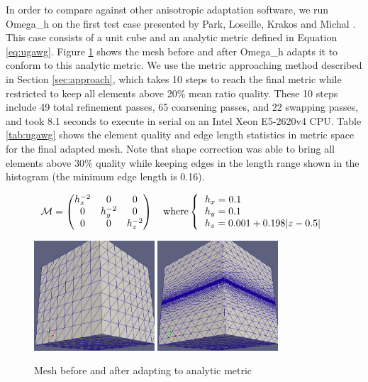 In order to compare against other anisotropic adaptation software,
we run Omega\_h on the first test case presented by Park,
Loseille, Krakos and Michal \cite{park2015comparing}.
This case consists of a unit cube and an analytic metric defined
in Equation \ref{eq:ugawg}.
Figure \ref{fig:ugawg} shows the mesh before and after Omega\_h adapts
it to conform to this analytic metric.
We use the metric approaching method described in Section \ref{sec:approach},
which takes 10 steps to reach the final metric while restricted
to keep all elements above 20\% mean ratio quality.
These 10 steps include 49 total refinement passes, 65 coarsening passes,
and 22 swapping passes, and took 8.1 seconds to execute in serial
on an Intel Xeon E5-2620v4 CPU.
Table \ref{tab:ugawg} shows the element quality and edge length statistics
in metric space for the final adapted mesh.
Note that shape correction was able to bring all elements above 30\% quality
while keeping edges in the length range shown in the histogram
(the minimum edge length is 0.16).

\begin{equation} \label{eq:ugawg}
\mathcal{M}=\begin{pmatrix}
h_x^{-2} & 0 & 0 \\
0 & h_y^{-2} & 0 \\
0 & 0 & h_z^{-2} \\
\end{pmatrix}
\quad\text{where}
\left\{\begin{tabular}{l}
$h_x = 0.1$ \\
$h_y = 0.1$ \\
$h_z = 0.001 + 0.198 | z - 0.5 |$ \\
\end{tabular}\right.
\end{equation}

\begin{figure}
\begin{center}
\includegraphics[width=0.4\textwidth]{ugawg_before.png}
\includegraphics[width=0.4\textwidth]{ugawg_after.png}
\caption{Mesh before and after adapting to analytic metric}
\label{fig:ugawg}
\end{center}
\end{figure}

